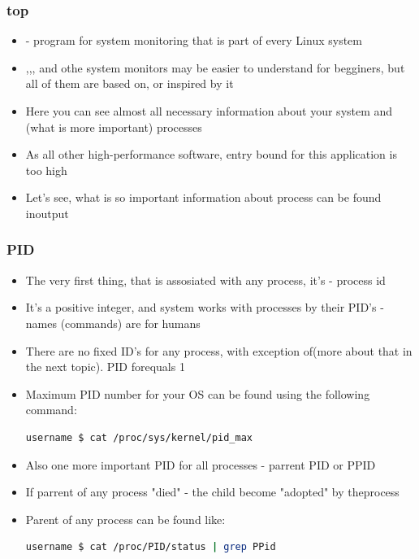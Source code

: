 \documentclass[usenames,dvipsnames,10pt,aspectratio=169]{beamer}
\begin{document}
\begin{frame}
    \frametitle{top}
    \begin{itemize}
        \item {}- program for system monitoring that is part of every Linux system
        \item {},,, and othe system monitors may be easier to understand for begginers, but all of them are based on, or inspired by it
        \item Here you can see almost all necessary information about your system and (what is more important) processes
        \item As all other high-performance software, entry bound for this application is too high
        \item Let's see, what is so important information about process can be found inoutput
    \end{itemize}
\end{frame}

\begin{frame}[fragile]
    \frametitle{PID}
    \begin{itemize}
        \item The very first thing, that is assosiated with any process, it's - process id 
        \item It's a positive integer, and system works with processes by their PID's - names (commands) are for humans 
        \item There are no fixed ID's for any process, with exception of(more about that in the next topic). PID forequals 1
        \item Maximum PID number for your OS can be found using the following command:
        \begin{lstlisting}[language=Bash, style=shellstyle] 
username $ cat /proc/sys/kernel/pid_max\end{lstlisting}
        \item Also one more important PID for all processes - parrent PID or PPID
        \item If parrent of any process "died" - the child become "adopted" by theprocess
        \item Parent of any process can be found like:
        \begin{lstlisting}[language=Bash, style=shellstyle] 
username $ cat /proc/PID/status | grep PPid \end{lstlisting}
    \end{itemize}
\end{frame}
\end{document}
